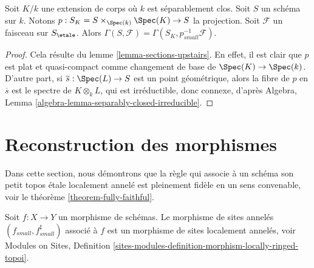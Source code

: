 \begin{lemma}
\label{lemma-sections-base-field-extension}
Soit $K/k$ une extension de corps o\`u $k$ est
s\'eparablement clos. Soit $S$ un sch\'ema sur $k$. Notons
$p : S_K = S \times_{\Spec(k)} \Spec(K) \to S$ la projection.
Soit $\mathcal{F}$ un faisceau sur $S_\etale$.
Alors $\Gamma(S, \mathcal{F}) = \Gamma(S_K, p^{-1}_{small}\mathcal{F})$.
\end{lemma}

\begin{proof}
Cela r\'esulte du lemme \ref{lemma-sections-upstairs}. En effet, il est clair
que $p$ est plat et quasi-compact comme changement de base de
$\Spec(K) \to \Spec(k)$. D'autre part, si $\overline{s} : \Spec(L) \to S$
est un point g\'eom\'etrique, alors la fibre de $p$ en $\overline{s}$
est le spectre de $K \otimes_k L$, qui est irr\'eductible, donc connexe, d'apr\`es
Algebra, Lemma \ref{algebra-lemma-separably-closed-irreducible}.
\end{proof}









\section{Reconstruction des morphismes}
\label{section-morphisms}

\noindent
Dans cette section, nous d\'emontrons que la r\`egle qui associe \`a un sch\'ema
son petit topos \'etale localement annel\'e est pleinement fid\`ele en un sens
convenable, voir le
th\'eor\`eme \ref{theorem-fully-faithful}.

\begin{lemma}
\label{lemma-morphism-locally-ringed}
Soit $f : X \to Y$ un morphisme de sch\'emas.
Le morphisme de sites annel\'es $(f_{small}, f_{small}^\sharp)$
associ\'e \`a $f$ est un morphisme de sites localement annel\'es, voir
Modules on Sites,
Definition \ref{sites-modules-definition-morphism-locally-ringed-topoi}.
\end{lemma}

